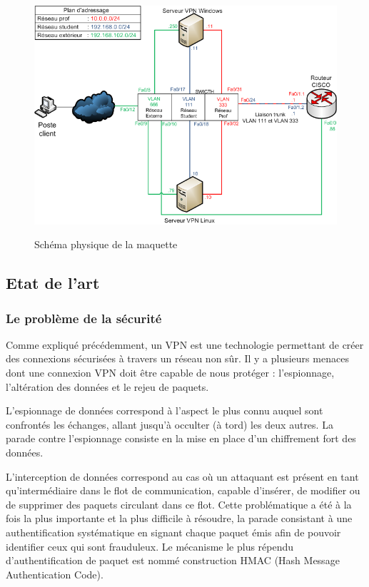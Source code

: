 \begin{figure}[H]
	\begin{center}
	\includegraphics[width=\textwidth]{partie_1/images/archi_phy.png}\\
	\end{center}
	\caption{Schéma physique de la maquette}
	\label{schema-physique-maquette}
\end{figure}

\subsection{Etat de l'art}

\subsubsection{Le problème de la sécurité}

Comme expliqué précédemment, un VPN est une technologie permettant de créer des connexions sécurisées à travers un réseau non sûr. Il y a plusieurs menaces dont une connexion VPN doit être capable de nous protéger : l'espionnage, l'altération des données et le rejeu de paquets.

L'espionnage de données correspond à l'aspect le plus connu auquel sont confrontés les échanges, allant jusqu'à occulter (à tord) les deux autres. La parade contre l'espionnage consiste en la mise en place d'un chiffrement fort des données.

L'interception de données correspond au cas où un attaquant est présent en tant qu'intermédiaire dans le flot de communication, capable d'insérer, de modifier ou de supprimer des paquets circulant dans ce flot. Cette problématique a été à la fois la plus importante et la plus difficile à résoudre, la parade consistant à une authentification systématique en signant chaque paquet émis afin de pouvoir identifier ceux qui sont frauduleux. Le mécanisme le plus répendu d'authentification de paquet est nommé construction HMAC (Hash Message Authentication Code).

